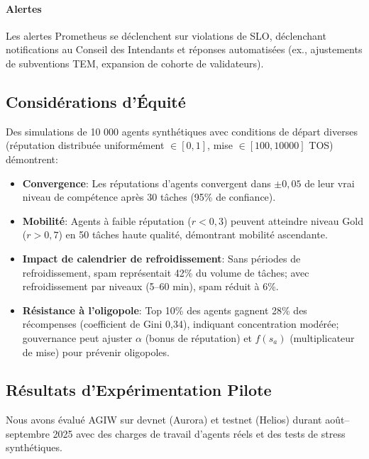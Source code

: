 \documentclass[11pt]{article}
\begin{document}
\paragraph{Alertes} Les alertes Prometheus se déclenchent sur violations de SLO, déclenchant notifications au Conseil des Intendants et réponses automatisées (ex., ajustements de subventions TEM, expansion de cohorte de validateurs).

\subsection{Considérations d'Équité}
Des simulations de 10 000 agents synthétiques avec conditions de départ diverses (réputation distribuée uniformément $\in [0,1]$, mise $\in [100, 10000]$ TOS) démontrent:
\begin{itemize}[noitemsep]
  \item \textbf{Convergence}: Les réputations d'agents convergent dans $\pm0,05$ de leur vrai niveau de compétence après 30 tâches (95\% de confiance).
  \item \textbf{Mobilité}: Agents à faible réputation ($r<0,3$) peuvent atteindre niveau Gold ($r>0,7$) en 50 tâches haute qualité, démontrant mobilité ascendante.
  \item \textbf{Impact de calendrier de refroidissement}: Sans périodes de refroidissement, spam représentait 42\% du volume de tâches; avec refroidissement par niveaux (5--60 min), spam réduit à 6\%.
  \item \textbf{Résistance à l'oligopole}: Top 10\% des agents gagnent 28\% des récompenses (coefficient de Gini 0,34), indiquant concentration modérée; gouvernance peut ajuster $\alpha$ (bonus de réputation) et $f(s_a)$ (multiplicateur de mise) pour prévenir oligopoles.
\end{itemize}

\subsection{Résultats d'Expérimentation Pilote}
\label{sec:pilot-results}
Nous avons évalué AGIW sur devnet (Aurora) et testnet (Helios) durant août--septembre 2025 avec des charges de travail d'agents réels et des tests de stress synthétiques.
\end{document}
